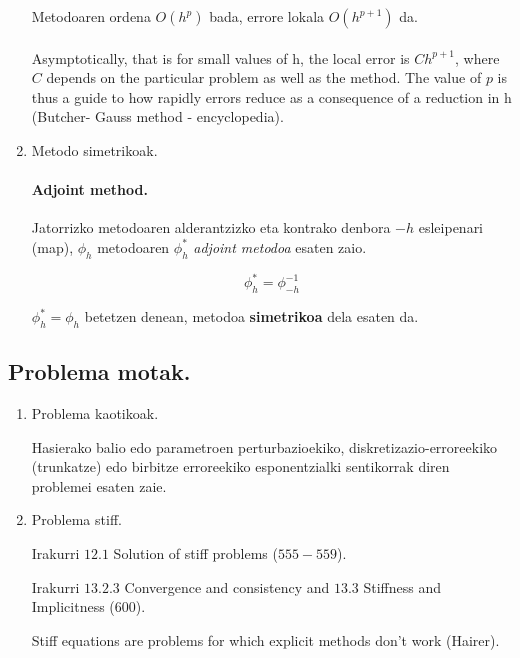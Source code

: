 \begin{enumerate}
Metodoaren ordena $O(h^p)$ bada, errore lokala $O(h^{p+1})$ da.

\paragraph*{} Asymptotically, that is for small values of h, the local error is $Ch^{p+1}$, where $C$ depends on the particular problem as well as the method. The value of $p$ is thus a guide to how rapidly errors reduce as a consequence of a reduction in h (Butcher- Gauss method - encyclopedia).

\item  Metodo simetrikoak.

\paragraph*{\textbf{Adjoint method}.} Jatorrizko metodoaren alderantzizko eta kontrako denbora $-h$ esleipenari (map), $\phi_h$ metodoaren $\phi_h^{*}$ \emph{adjoint metodoa} esaten zaio.

\begin{equation*}
\phi_h^{*}=\phi_{-h}^{-1}
\end{equation*}

$\phi_h^{*}=\phi_h$ betetzen denean, metodoa \textbf{simetrikoa} dela esaten da. 

\end{enumerate}


\subsection{Problema motak.}

\begin{enumerate}

\item Problema kaotikoak. 

Hasierako balio edo parametroen perturbazioekiko, diskretizazio-erroreekiko (trunkatze) edo birbitze erroreekiko esponentzialki sentikorrak diren problemei esaten zaie.

\item Problema stiff.

Irakurri $12.1$ Solution of stiff problems ($555-559$).

Irakurri $13.2.3$ Convergence and consistency and $13.3$ Stiffness and Implicitness (600).

Stiff equations are problems for which explicit methods don't work (Hairer). 

\end{enumerate}


